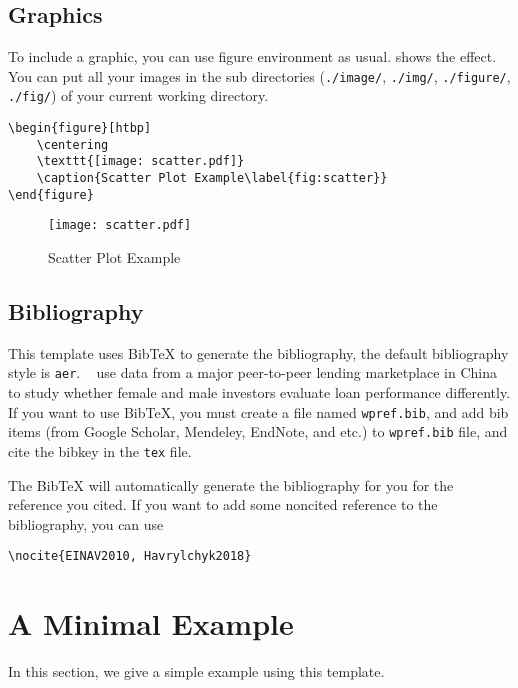 \documentclass[en]{elegantpaper}
\begin{document}
\subsection{Graphics}
To include a graphic, you can use figure environment as usual.  shows the effect. You can put all your images in the sub directories (\lstinline{./image/}, \lstinline{./img/}, \lstinline{./figure/}, \lstinline{./fig/}) of your current working directory.

\begin{lstlisting}
\begin{figure}[htbp]
	\centering
	\texttt{[image: scatter.pdf]}
	\caption{Scatter Plot Example\label{fig:scatter}}
\end{figure}
\end{lstlisting}
\begin{figure}[htbp]
	\centering
	\texttt{[image: scatter.pdf]}
	\caption{Scatter Plot Example\label{fig:scatter}}
\end{figure}

\subsection{Bibliography}
This template uses Bib\TeX{} to generate the bibliography, the default bibliography style is \lstinline{aer}. ~\cite{Chen2018} use data from a major peer-to-peer lending marketplace in China to study whether female and male investors evaluate loan performance differently. If you want to use Bib\TeX{}, you must create a file named \lstinline{wpref.bib}, and add bib items (from Google Scholar, Mendeley, EndNote, and etc.) to \lstinline{wpref.bib} file, and cite the bibkey in the \lstinline{tex} file. 

The Bib\TeX{} will automatically generate the bibliography for you for the reference you cited. If you want to add some noncited reference to the bibliography, you can use 

\begin{lstlisting}
\nocite{EINAV2010, Havrylchyk2018} 
\end{lstlisting}

\section{A Minimal Example}
In this section, we give a simple example using this template.
\end{document}
